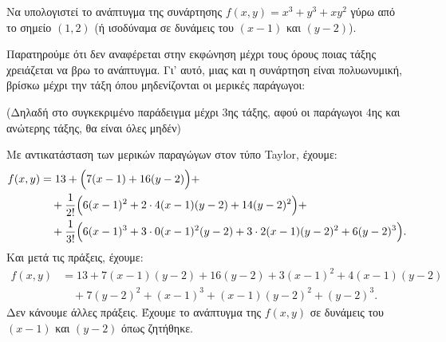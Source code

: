 \documentclass[a4paper,table]{report}
\begin{document}
\begin{example}
  Να υπολογιστεί το ανάπτυγμα της συνάρτησης $f(x,y)=x^3+y^3+xy^2$ γύρω από το 
  σημείο $ (1,2) $ (ή ισοδύναμα σε δυνάμεις του $(x-1)$ και $(y-2)$).
\end{example}
\begin{solution}
  Παρατηρούμε ότι δεν αναφέρεται στην εκφώνηση μέχρι τους όρους ποιας τάξης 
  χρειάζεται να βρω το ανάπτυγμα.  Γι' αυτό, μιας και η συνάρτηση είναι πολυωνυμική,
  βρίσκω μέχρι την τάξη όπου μηδενίζονται οι μερικές παράγωγοι: 

  (Δηλαδή στο συγκεκριμένο παράδειγμα μέχρι $3$ης τάξης, αφού οι παράγωγοι 
  $4$ης και ανώτερης τάξης, θα είναι όλες μηδέν)

  \vspace{\baselineskip}


  \vspace{\baselineskip}

  Με αντικατάσταση των μερικών παραγώγων στον τύπο Taylor, έχουμε:
  \begin{align*}
    f(x,y)&=13+\Bigl(7(x-1)+16(y-2)\Bigr)+ \\ 
          &\quad +\frac{1}{2!}\Bigl(6(x-1)^2 +2\cdot 4(x-1)(y-2)+14(y-2)^2\Bigr)+ \\
          &\quad +\frac{1}{3!}\Bigl(6(x-1)^3+3\cdot 0(x-1)^2(y-2)+3
          \cdot 2(x-1)(y-2)^2+6(y-2)^3\Bigr).
  \end{align*}
  Και μετά τις πράξεις, έχουμε: 
  \begin{align*}
    f(x,y)&=13+7(x-1)(y-2)+16(y-2)+3(x-1)^2+4(x-1)(y-2) \\
          &\quad +7(y-2)^2+(x-1)^3+(x-1)(y-2)^2+(y-2)^3.
  \end{align*}
  Δεν κάνουμε άλλες πράξεις.
  Έχουμε το ανάπτυγμα της $f(x,y)$ σε δυνάμεις του $(x-1)$ και $(y-2)$ όπως ζητήθηκε.
\end{solution}
\end{document}
